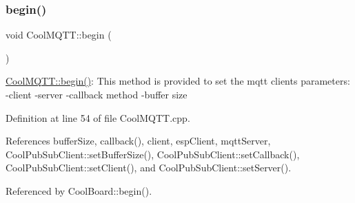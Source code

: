 \subsubsection{\texorpdfstring{begin()}{begin()}}
{\footnotesize\ttfamily void Cool\+M\+Q\+T\+T\+::begin (\begin{DoxyParamCaption}{ }\end{DoxyParamCaption})}

\hyperlink{class_cool_m_q_t_t_ac9248808641ebf3054ed0620ea9d0100}{Cool\+M\+Q\+T\+T\+::begin()}\+: This method is provided to set the mqtt client\textquotesingle{}s parameters\+: -\/client -\/server -\/callback method -\/buffer size 

Definition at line 54 of file Cool\+M\+Q\+T\+T.\+cpp.



References buffer\+Size, callback(), client, esp\+Client, mqtt\+Server, Cool\+Pub\+Sub\+Client\+::set\+Buffer\+Size(), Cool\+Pub\+Sub\+Client\+::set\+Callback(), Cool\+Pub\+Sub\+Client\+::set\+Client(), and Cool\+Pub\+Sub\+Client\+::set\+Server().



Referenced by Cool\+Board\+::begin().


